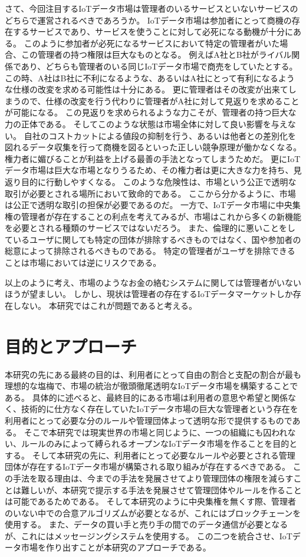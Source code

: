 さて、今回注目するIoTデータ市場は管理者のいるサービスといないサービスのどちらで運営されるべきであろうか。
IoTデータ市場は参加者にとって商機の存在するサービスであり、サービスを使うことに対して必死になる動機が十分にある。
このように参加者が必死になるサービスにおいて特定の管理者がいた場合、この管理者の持つ権限は巨大なものとなる。
例えばA社とB社がライバル関係であり、どちらも管理者のいる同じIoTデータ市場で商売をしていたとする。
この時、A社はB社に不利になるような、あるいはA社にとって有利になるような仕様の改変を求める可能性は十分にある。
更に管理者はその改変が出来てしまうので、仕様の改変を行う代わりに管理者がA社に対して見返りを求めることが可能になる。
この見返りを求められるような力こそが、管理者の持つ巨大な力の正体である。
そしてこのような状態は市場全体に対して良い影響を与えない。
自社のコストカットによる値段の抑制を行う、あるいは他者との差別化を図れるデータ収集を行って商機を図るといった正しい競争原理が働かなくなる。
権力者に媚びることが利益を上げる最善の手法となってしまうためだ。
更にIoTデータ市場は巨大な市場となりうるため、その権力者は更に大きな力を持ち、見返り目的に行動しやすくなる。
このような危険性は、市場という公正で透明な取引が必要とされる場所において致命的である。
ここから分かるように、市場は公正で透明な取引の担保が必要であるのだ。
一方で、IoTデータ市場に中央集権の管理者が存在することの利点を考えてみるが、市場はこれから多くの新機能を必要とされる種類のサービスではないだろう。
また、倫理的に悪いことをしているユーザに関しても特定の団体が排除するべきものではなく、国や参加者の総意によって排除されるべきものである。
特定の管理者がユーザを排除できることは市場においては逆にリスクである。

以上のように考え、市場のようなお金の絡むシステムに関しては管理者がいないほうが望ましい。
しかし、現状は管理者の存在するIoTデータマーケットしか存在しない。
本研究ではこれが問題であると考える。

\section{目的とアプローチ}
本研究の先にある最終の目的は、利用者にとって自由の割合と支配の割合が最も理想的な塩梅で、市場の統治が徹頭徹尾透明なIoTデータ市場を構築することである。
具体的に述べると、最終目的にある市場は利用者の意思や希望と関係なく、技術的に仕方なく存在していたIoTデータ市場の巨大な管理者という存在を利用者にとって必要な分のルールや管理団体よって透明な形で提供するものである。
そこで本研究では現実世界の市場と同じように、一つの組織にも囚われない、ルールのみによって縛られるオープンなIoTデータ市場を作ることを目的とする。
そして本研究の先に、利用者にとって必要なルールや必要とされる管理団体が存在するIoTデータ市場が構築される取り組みが存在するべきである。
この手法を取る理由は、今までの手法を発展させてより管理団体の権限を減らすことは難しいが、本研究で提示する手法を発展させて管理団体やルールを作ることは可能であるためである。
そして本研究のように中央集権を無くす際、管理者のいない中での合意アルゴリズムが必要となるが、これにはブロックチェーンを使用する。
また、データの買い手と売り手の間でのデータ通信が必要となるが、これにはメッセージングシステムを使用する。
この二つを統合させ、IoTデータ市場を作り出すことが本研究のアプローチである。


